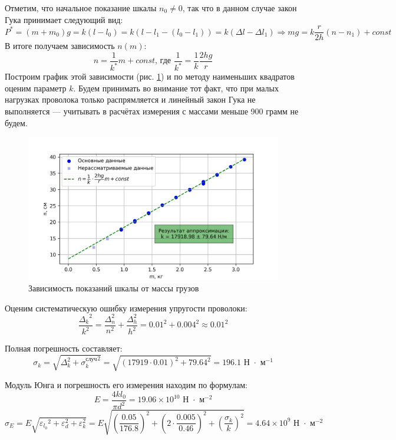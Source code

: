 \documentclass[a4paper, 10pt]{article}
\renewcommand{\epsilon}{\varepsilon}
\begin{document}
			Отметим, что начальное показание шкалы $n_0 \neq 0$, так что в данном случае закон Гука принимает следующий вид:
			\[P^\ast = (m + m_0)g = k (l - l_0) = k \left(l - l_1 - \left(l_0 - l_1\right)\right) = k (\Delta l - \Delta l_1) \Rightarrow mg = k\frac{r}{2h}(n - n_1) + const\]
			В итоге получаем зависимость $n(m)$:
			\[n = \frac{1}{k^\ast} m + const \text{, где } \frac{1}{k^\ast} = \frac1k \frac{2hg}{r}\]
			Построим график этой зависимости (рис. \ref{fig:first_part}) и по методу наименьших квадратов оценим параметр $k$. Будем принимать во внимание тот факт, что при малых нагрузках проволока только распрямляется и линейный закон Гука не выполняется --- учитывать в расчётах измерения с массами меньше 900 грамм не будем.
			\newpage
			\begin{figure}[t]
				\centering
				\includegraphics[width=\linewidth]{first_part}
				\caption{Зависимость показаний шкалы от массы грузов}
				\label{fig:first_part}
			\end{figure}
		
			Оценим систематическую ошибку измерения упругости проволоки:
			\[\frac{{\Delta_k}^2}{k^2} = \frac{\Delta_n^2}{n^2} + \frac{\Delta_h^2}{h^2} = 0.01^2 + 0.004^2 \approx 0.01^2\]
			
			Полная погрешность составляет:
			\[\sigma_k = \sqrt{\Delta_k^2 + {\sigma_k^\text{случ}}^2} = \sqrt{\left(17919 \cdot 0.01\right)^2 + 79.64^2} = 196.1 \text{ Н $\cdot$ м$^{-1}$}\]
			
			Модуль Юнга и погрешность его измерения находим по формулам:
			\[E = \frac{4kl_0}{\pi d^2} = 19.06 \times 10^{10} \text{ Н $\cdot$ м$^{-2}$}\]
			\[\sigma_E= E\sqrt{{\epsilon_{l_0}}^2 + \epsilon_d^2 + \epsilon_k^2} = E\sqrt{\left(\frac{0.05}{176.8}\right)^2 + \left(2 \cdot \frac{0.005}{0.46}\right)^2 + \left(\frac{\sigma_k}{k}\right)^2} = 4.64\times10^9 \text{ Н $\cdot$ м$^{-2}$}\]
			
\end{document}
